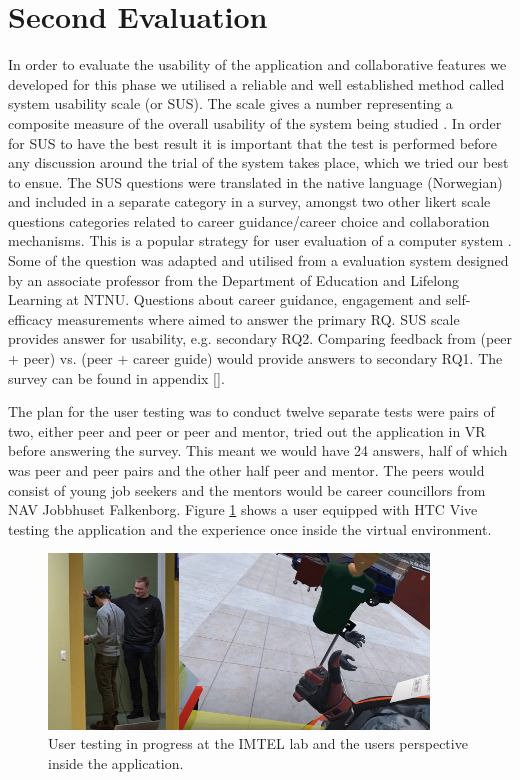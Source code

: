\section{Second Evaluation}
\label{section:secondEvalPhase2}
In order to evaluate the usability of the application and collaborative features we developed for this phase we utilised a reliable and well established method called system usability scale (or SUS). The scale gives a number representing a composite measure of the overall usability of the system being studied \cite{brooke1996sus}. In order for SUS to have the best result it is important that the test is performed before any discussion around the trial of the system takes place, which we tried our best to ensue.
The SUS questions were translated in the native language (Norwegian) and included in a separate category in a survey, amongst two other likert scale questions categories related to career guidance/career choice and collaboration mechanisms. This is a popular strategy for user evaluation of a computer system \cite{oates2005researching}. Some of the question was adapted and utilised from a evaluation system designed by an associate professor from the Department of Education and Lifelong Learning at NTNU. Questions about career guidance, engagement and self-efficacy measurements where aimed to answer the primary RQ. SUS scale provides answer for usability, e.g. secondary RQ2. Comparing feedback from (peer + peer) vs. (peer + career guide) would provide answers to secondary RQ1.  The survey can be found in appendix \ref{}.

The plan for the user testing was to conduct twelve separate tests were pairs of two, either peer and peer or peer and mentor, tried out the application in VR before answering the survey. This meant we would have 24 answers, half of which was peer and peer pairs and the other half peer and mentor. The peers would consist of young job seekers and the mentors would be career councillors from NAV Jobbhuset Falkenborg. Figure \ref{fig:tastingPhase2} shows a user equipped with HTC Vive testing the application and the experience once inside the virtual environment. 


\begin{figure}[]
  \centering
   \captionsetup{width=.9\linewidth}
    \includegraphics[width=0.9\textwidth]{fig/phase_2/phase2_testing.jpg}
 \caption{User testing in progress at the IMTEL lab and the users perspective inside the application.}
\label{fig:tastingPhase2}
\end{figure}


